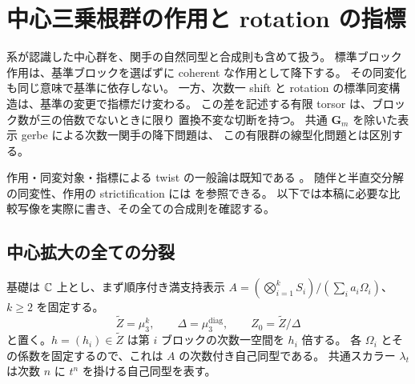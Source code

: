 \section{中心三乗根群の作用と rotation の指標}
\label{mbza:sec:central-action}

系が認識した中心群を、関手の自然同型と合成則も含めて扱う。
標準ブロック作用は、基準ブロックを選ばずに coherent な作用として降下する。
その同変化も同じ意味で基準に依存しない。
一方、次数一 shift と rotation の標準同変構造は、基準の変更で指標だけ変わる。
この差を記述する有限 torsor は、ブロック数が三の倍数でないときに限り
置換不変な切断を持つ。
共通 $\mathbf G_m$ を除いた表示 gerbe による次数一関手の降下問題は、
この有限群の線型化問題とは区別する。

作用・同変対象・指標による twist の一般論は既知である
\cite[Definitions~3.1, 3.5, \S4]{MEDElagin}。
随伴と半直交分解の同変性、作用の strictification には
\cite[Proposition~3.13, Theorems~5.4, 6.2]{MBZAShinder}を参照できる。
以下では本稿に必要な比較写像を実際に書き、その全ての合成則を確認する。

\subsection{中心拡大の全ての分裂}

基礎は $\mathbb C$ 上とし、まず順序付き満支持表示
$A=(\bigotimes_{i=1}^kS_i)/(\sum_i a_i\Omega_i)$、$k\ge2$ を固定する。
\[
 \widetilde Z=\mu_3^k,\qquad
 \Delta=\mu_3^{\mathrm{diag}},\qquad Z_0=\widetilde Z/\Delta
\]
と置く。$h=(h_i)\in\widetilde Z$ は第 $i$ ブロックの次数一空間を $h_i$ 倍する。
各 $\Omega_i$ とその係数を固定するので、これは $A$ の次数付き自己同型である。
共通スカラー $\lambda_t$ は次数 $n$ に $t^n$ を掛ける自己同型を表す。

